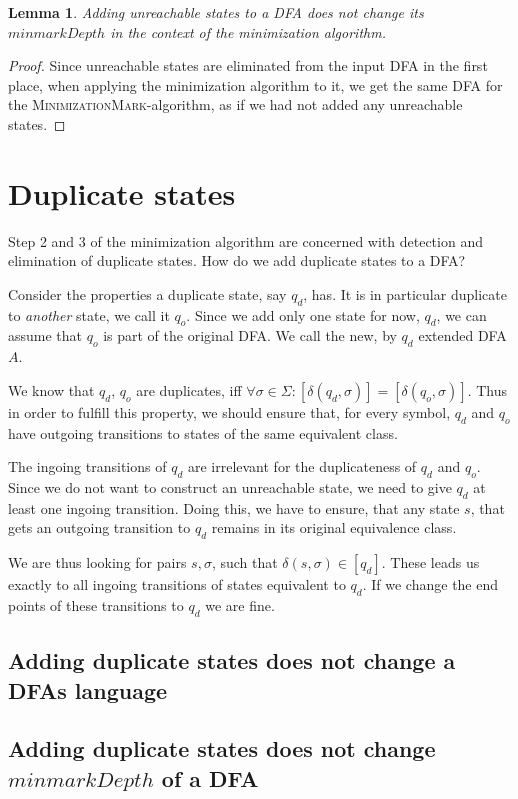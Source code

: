 \documentclass[a4paper, oneside, 11pt]{report}
\newtheorem{lemma}{Lemma}
\theoremstyle{definition}
\theoremstyle{remark}
\newcommand{\MinMark}{\textsc{MinimizationMark}}
\begin{document}
\begin{lemma}
	Adding unreachable states to a DFA does not change its $minmarkDepth$ in the context of the minimization algorithm.
\end{lemma}
\begin{proof}
	Since unreachable states are eliminated from the input DFA in the first place, when applying the minimization algorithm to it, we get the same DFA for the \MinMark-algorithm, as if we had not added any unreachable states.
\end{proof}

\section{Duplicate states}

Step 2 and 3 of the minimization algorithm are concerned with detection and elimination of duplicate states. How do we add duplicate states to a DFA?

Consider the properties a duplicate state, say $q_d$, has. It is in particular duplicate to \emph{another} state, we call it $q_o$. Since we add only one state for now, $q_d$, we can assume that $q_o$ is part of the original DFA. We call the new, by $q_d$ extended DFA $A$.

We know that $q_d$, $q_o$ are duplicates, iff $\forall \sigma \in \Sigma \colon [\delta(q_d, \sigma)] = [\delta(q_o, \sigma)]$. Thus in order to fulfill this property, we should ensure that, for every symbol, $q_d$ and $q_o$ have outgoing transitions to states of the same equivalent class.

The ingoing transitions of $q_d$ are irrelevant for the duplicateness of $q_d$ and $q_o$. Since we do not want to construct an unreachable state, we need to give $q_d$ at least one ingoing transition. Doing this, we have to ensure, that any state $s$, that gets an outgoing transition to $q_d$ remains in its original equivalence class.

We are thus looking for pairs $s,\sigma$, such that $\delta(s, \sigma) \in [q_d]$. These leads us exactly to all ingoing transitions of states equivalent to $q_d$. If we change the end points of these transitions to $q_d$ we are fine.

\subsection{Adding duplicate states does not change a DFAs language}

\subsection{Adding duplicate states does not change $minmarkDepth$ of a DFA}
\end{document}
